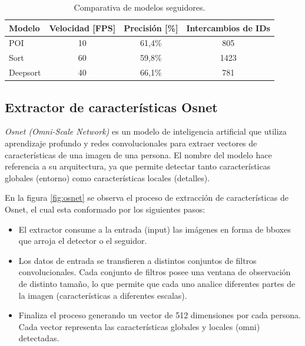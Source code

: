 \begin{table}[h]
	\centering
	\caption[Comparativa de modelos seguidores]{Comparativa de modelos seguidores.}
	\begin{tabular}{l c c c}    
		\toprule
		\textbf{Modelo} & \textbf{Velocidad [FPS]}  & \textbf{Precisión [\%]} & \textbf{Intercambios de IDs} \\
		\midrule
		POI & 10 & 61,4\% & 805 \\
		Sort & 60 & 59,8\% & 1423 \\
		Deepsort & 40 & 66,1\% & 781 \\
		\bottomrule
		\hline
	\end{tabular}
	\label{tab:comparativaSeguidores}
\end{table}

\newpage

\subsection{Extractor de características Osnet}
\label{sec:exactorOsnet}

\textit{Osnet (Omni-Scale Network)} \citep{OSNET} es un modelo de inteligencia artificial que utiliza aprendizaje profundo y redes convolucionales para extraer vectores de características de una imagen de una persona. El nombre del modelo hace referencia a su arquitectura, ya que permite detectar tanto características globales (entorno) como características locales (detalles). 

En la figura \ref{fig:osnet} se observa el proceso de extracción de características de Osnet, el cual esta conformado por los siguientes pasos:

\begin{itemize}
\item El extractor consume a la entrada (input) las imágenes en forma de bboxes que arroja el detector o el seguidor.
\item Los datos de entrada se transfieren a distintos conjuntos de filtros convolucionales. Cada conjunto de filtros posee una ventana de observación de distinto tamaño, lo que permite que cada uno analice diferentes partes de la imagen (características a diferentes escalas).
\item Finaliza el proceso generando un vector de 512 dimensiones por cada persona. Cada vector representa las características globales y locales (omni) detectadas.
\end{itemize}

